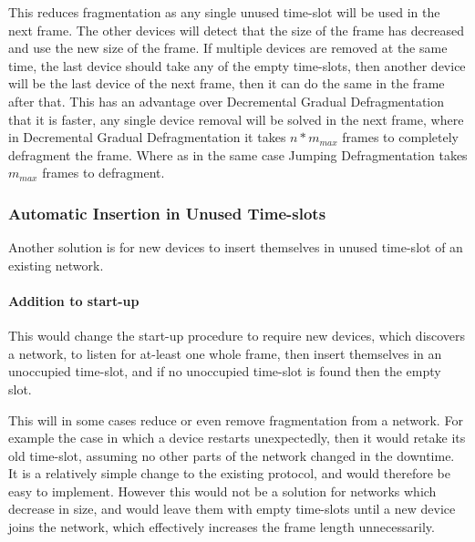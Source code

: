 
\bigskip

This reduces fragmentation as any single unused time-slot will be used in the next frame.
The other devices will detect that the size of the frame has decreased and use the new size of the frame. 
If multiple devices are removed at the same time, the last device should take any of the empty time-slots, then another device will be the last device of the next frame, then it can do the same in the frame after that. 
This has an advantage over Decremental Gradual Defragmentation that it is faster, any single device removal will be solved in the next frame, where in Decremental Gradual Defragmentation it takes $n * m_{max}$ frames to completely defragment the frame. 
Where as in the same case Jumping Defragmentation takes $m_{max}$ frames to defragment. 

\subsubsection{Automatic Insertion in Unused Time-slots}
Another solution is for new devices to insert themselves in unused time-slot of an existing network.

\paragraph{Addition to start-up}
This would change the start-up procedure to require new devices, which discovers a network, to listen for at-least one whole frame, then insert themselves in an unoccupied time-slot, and if no unoccupied time-slot is found then the empty slot. 


\bigskip

This will in some cases reduce or even remove fragmentation from a network. 
For example the case in which a device restarts unexpectedly, then it would retake its old time-slot, assuming no other parts of the network changed in the downtime.
It is a relatively simple change to the existing protocol, and would therefore be easy to implement.  
However this would not be a solution for networks which decrease in size, and would leave them with empty time-slots until a new device joins the network, which effectively increases the frame length unnecessarily.

